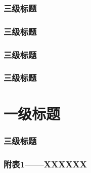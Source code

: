 \documentclass[]{article}
\begin{document}
		\subsubsection{三级标题}
		\subsubsection{三级标题}
		\subsubsection{三级标题}
		\subsubsection{三级标题}
		\newpage
		\section{一级标题}
		\subsubsection{三级标题}
		
		\appendix 
		\renewcommand{\appendixname}{Appendix~\Alph{subsubsection}}
		\subsubsection{附表1——XXXXXX}
		
		\begin{thebibliography}{9}%
		\end{thebibliography}
		
\end{document}
